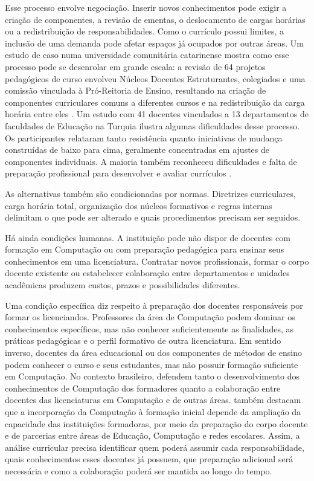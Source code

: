 Esse processo envolve negociação. Inserir novos conhecimentos pode exigir a criação de componentes, a revisão de ementas, o deslocamento de cargas horárias ou a redistribuição de responsabilidades. Como o currículo possui limites, a inclusão de uma demanda pode afetar espaços já ocupados por outras áreas. Um estudo de caso numa universidade comunitária catarinense mostra como esse processo pode se desenrolar em grande escala: a revisão de 64 projetos pedagógicos de curso envolveu Núcleos Docentes Estruturantes, colegiados e uma comissão vinculada à Pró-Reitoria de Ensino, resultando na criação de componentes curriculares comuns a diferentes cursos e na redistribuição da carga horária entre eles \cite{krahe2013reforma}. Um estudo com 41 docentes vinculados a 13 departamentos de faculdades de Educação na Turquia ilustra algumas dificuldades desse processo. Os participantes relataram tanto resistência quanto iniciativas de mudança construídas de baixo para cima, geralmente concentradas em ajustes de componentes individuais. A maioria também reconheceu dificuldades e falta de preparação profissional para desenvolver e avaliar currículos \cite{aydinok2025behind}.

As alternativas também são condicionadas por normas. Diretrizes curriculares, carga horária total, organização dos núcleos formativos e regras internas delimitam o que pode ser alterado e quais procedimentos precisam ser seguidos.

Há ainda condições humanas. A instituição pode não dispor de docentes com formação em Computação ou com preparação pedagógica para ensinar seus conhecimentos em uma licenciatura. Contratar novos profissionais, formar o corpo docente existente ou estabelecer colaboração entre departamentos e unidades acadêmicas produzem custos, prazos e possibilidades diferentes.

Uma condição específica diz respeito à preparação dos docentes responsáveis por formar os licenciandos. Professores da área de Computação podem dominar os conhecimentos específicos, mas não conhecer suficientemente as finalidades, as práticas pedagógicas e o perfil formativo de outra licenciatura. Em sentido inverso, docentes da área educacional ou dos componentes de métodos de ensino podem conhecer o curso e seus estudantes, mas não possuir formação suficiente em Computação. No contexto brasileiro,  defendem tanto o desenvolvimento dos conhecimentos de Computação dos formadores quanto a colaboração entre docentes das licenciaturas em Computação e de outras áreas.  também destacam que a incorporação da Computação à formação inicial depende da ampliação da capacidade das instituições formadoras, por meio da preparação do corpo docente e de parcerias entre áreas de Educação, Computação e redes escolares. Assim, a análise curricular precisa identificar quem poderá assumir cada responsabilidade, quais conhecimentos esses docentes já possuem, que preparação adicional será necessária e como a colaboração poderá ser mantida ao longo do tempo.

